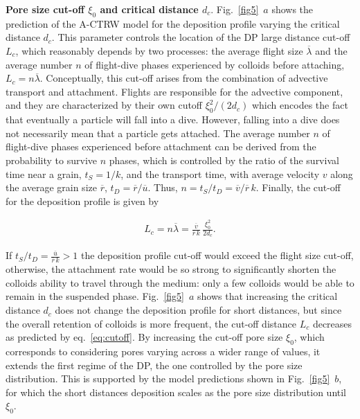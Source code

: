 \documentclass[singlecolumn,pre,notitlepage,preprintnumbers,floatfix,superscriptaddress]{revtex4-1}
\begin{document}
\noindent
\textbf{Pore size cut-off $\xi_0$ and critical distance $d_c$}.
Fig.~\ref{fig5}~$a$ shows the prediction of the A-CTRW model for the deposition profile varying the critical distance $d_c$. This parameter controls the location of the DP large distance cut-off $L_c$, which reasonably depends by two processes: the average flight size $\overline{\lambda}$ and the average number $n$ of flight-dive phases experienced by colloids before attaching, $L_c = n \overline{\lambda}$. Conceptually, this cut-off arises from the combination of advective transport and attachment. Flights are responsible for the advective component, and they are characterized by their own cutoff $\xi_0^2/(2d_c)$ which encodes the fact that eventually a particle will fall into a dive. However, falling into a dive does not necessarily mean that a particle gets attached. The average number $n$ of flight-dive phases experienced before attachment can be derived from the probability to survive $n$ phases, which is controlled by the ratio of the survival time near a grain, $t_S = 1/k$, and the transport time, with average velocity $v$ along the average grain size $\overline{r}$, $t_D = \overline{r} / \overline{u}$. Thus, $n = t_S / t_D = \overline{v}/\overline{r} \, k$. Finally, the cut-off for the deposition profile is given by

\begin{align}\label{eq:cutoff}
	L_c = n \overline{\lambda} = \frac{\overline{v}}{\overline{r}\, k} \, \frac{\xi_0^2}{2d_c}.
\end{align}

If $t_S / t_D = \frac{\overline{u}}{\overline{r}\, k} > 1$ the deposition profile cut-off would exceed the flight size cut-off, otherwise, the attachment rate would be so strong to significantly shorten the colloids ability to travel through the medium: only a few colloids would be able to remain in the suspended phase. Fig.~\ref{fig5}~$a$ shows that increasing the critical distance $d_c$ does not change the deposition profile for short distances, but since the overall retention of colloids is more frequent, the cut-off distance $L_c$ decreases as predicted by eq.~\eqref{eq:cutoff}. By increasing the cut-off pore size $\xi_0$, which corresponds to considering pores varying across a wider range of values, it extends the first regime of the DP, the one controlled by the pore size distribution. This is supported by the model predictions shown in Fig.~\ref{fig5}~$b$, for which the short distances deposition scales as the pore size distribution until $\xi_0$.\\
\end{document}
